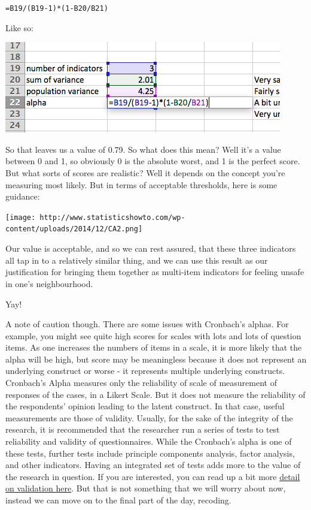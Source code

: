 \documentclass[
]{book}
\begin{document}
\texttt{=B19/(B19-1)*(1-B20/B21)}

Like so:

\includegraphics{imgs/final_calc_alpha.png}

So that leaves us a value of 0.79. So what does this mean? Well it's a value between 0 and 1, so obviously 0 is the absolute worst, and 1 is the perfect score. But what sorts of scores are realistic? Well it depends on the concept you're measuring most likely. But in terms of acceptable thresholds, here is some guidance:

\texttt{[image: http://www.statisticshowto.com/wp-content/uploads/2014/12/CA2.png]}

Our value is acceptable, and so we can rest assured, that these three indicators all tap in to a relatively similar thing, and we can use this result as our justification for bringing them together as multi-item indicators for feeling unsafe in one's neighbourhood.

Yay!

A note of caution though. There are some issues with Cronbach's alphas. For example, you might see quite high scores for scales with lots and lots of question items. As one increases the numbers of items in a scale, it is more likely that the alpha will be high, but score may be meaningless because it does not represent an underlying construct or worse - it represents multiple underlying constructs. Cronbach's Alpha measures only the reliability of scale of measurement of responses of the cases, in a Likert Scale. But it does not measure the reliability of the respondents' opinion leading to the latent construct. In that case, useful measurements are those of validity. Usually, for the sake of the integrity of the research, it is recommended that the researcher run a series of tests to test reliability and validity of questionnaires. While the Cronbach's alpha is one of these tests, further tests include principle components analysis, factor analysis, and other indicators. Having an integrated set of tests adds more to the value of the research in question. If you are interested, you can read up a bit more \href{http://onlinelibrary.wiley.com.manchester.idm.oclc.org/doi/10.1002/9780470024522.ch5/pdf}{detail on validation here}. But that is not something that we will worry about now, instead we can move on to the final part of the day, recoding.
\end{document}
